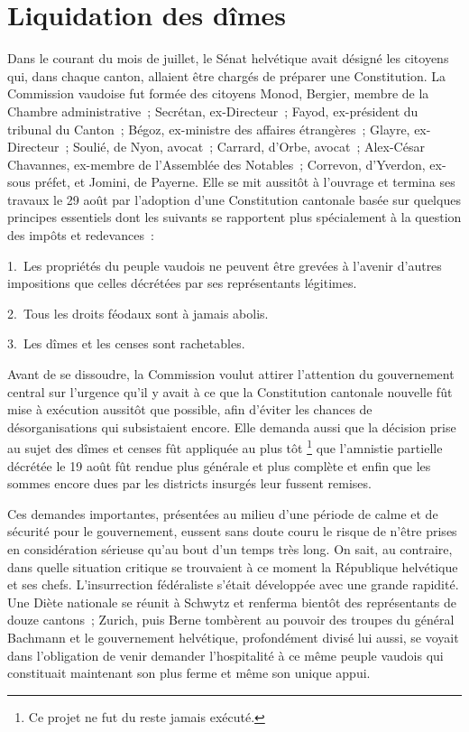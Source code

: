 \documentclass[french,twoside]{book} %
\begin{document}
\section[{Liquidation des dîmes}]{Liquidation des dîmes}
\noindent Dans le courant du mois de juillet, le Sénat helvétique avait désigné les citoyens qui, dans chaque canton, allaient être chargés de préparer une Constitution. La Commission vaudoise fut formée des citoyens Monod, Bergier, membre de la Chambre administrative ; Secrétan, ex-Directeur ; Fayod, ex-président du tribunal du Canton ; Bégoz, ex-ministre des affaires étrangères ; Glayre, ex-Directeur ; Soulié, de Nyon, avocat ; Carrard, d’Orbe, avocat ; Alex-César Chavannes, ex-membre de l’Assemblée des Notables ; Correvon, d’Yverdon, ex-sous préfet, et Jomini, de Payerne. Elle se mit aussitôt à l’ouvrage et termina ses travaux le 29 août par l’adoption d’une Constitution cantonale basée sur quelques principes essentiels dont les suivants se rapportent plus spécialement à la question des impôts et redevances :\par
1. Les propriétés du peuple vaudois ne peuvent être grevées à l’avenir d’autres impositions que celles décrétées par ses représentants légitimes.\par
2. Tous les droits féodaux sont à jamais abolis.\par
3. Les dîmes et les censes sont rachetables.\par
Avant de se dissoudre, la Commission voulut attirer l’attention du gouvernement central sur l’urgence qu’il y avait à ce que la Constitution cantonale nouvelle fût mise à exécution aussitôt que possible, afin d’éviter les chances de désorganisations qui subsistaient encore. Elle demanda aussi que la décision prise au sujet des dîmes et censes fût appliquée au plus tôt \footnote{Ce projet ne fut du reste jamais exécuté.} que l’amnistie partielle décrétée le 19 août fût rendue plus générale et plus complète et enfin que les sommes encore dues par les districts insurgés leur fussent remises.\par
Ces demandes importantes, présentées au milieu d’une période de calme et de sécurité pour le gouvernement, eussent sans doute couru le risque de n’être prises en considération sérieuse qu’au bout d’un temps très long. On sait, au contraire, dans quelle situation critique se trouvaient à ce moment la République helvétique et ses chefs. L’insurrection fédéraliste s’était développée avec une grande rapidité. Une Diète nationale se réunit à Schwytz et renferma bientôt des représentants de douze cantons ; Zurich, puis Berne tombèrent au pouvoir des troupes du général Bachmann et le gouvernement helvétique, profondément divisé lui aussi, se voyait dans l’obligation de venir demander l’hospitalité à ce même peuple vaudois qui constituait maintenant son plus ferme et même son unique appui.\par
\end{document}
